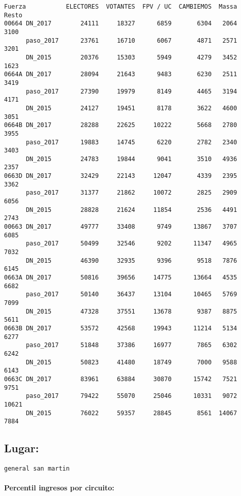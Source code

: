 \documentclass[11pt]{article}
\begin{document}
    \begin{verbatim}
Fuerza           ELECTORES  VOTANTES  FPV / UC  CAMBIEMOS  Massa  Resto
00664 DN_2017        24111     18327      6859       6304   2064   3100
      paso_2017      23761     16710      6067       4871   2571   3201
      DN_2015        20376     15303      5949       4279   3452   1623
0664A DN_2017        28094     21643      9483       6230   2511   3419
      paso_2017      27390     19979      8149       4465   3194   4171
      DN_2015        24127     19451      8178       3622   4600   3051
0664B DN_2017        28288     22625     10222       5668   2780   3955
      paso_2017      19883     14745      6220       2782   2340   3403
      DN_2015        24783     19844      9041       3510   4936   2357
0663D DN_2017        32429     22143     12047       4339   2395   3362
      paso_2017      31377     21862     10072       2825   2909   6056
      DN_2015        28828     21624     11854       2536   4491   2743
00663 DN_2017        49777     33408      9749      13867   3707   6085
      paso_2017      50499     32546      9202      11347   4965   7032
      DN_2015        46390     32935      9396       9518   7876   6145
0663A DN_2017        50816     39656     14775      13664   4535   6682
      paso_2017      50140     36437     13104      10465   5769   7099
      DN_2015        47328     37551     13678       9387   8875   5611
0663B DN_2017        53572     42568     19943      11214   5134   6277
      paso_2017      51848     37386     16977       7865   6302   6242
      DN_2015        50823     41480     18749       7000   9588   6143
0663C DN_2017        83961     63884     30870      15742   7521   9751
      paso_2017      79422     55070     25046      10331   9072  10621
      DN_2015        76022     59357     28845       8561  14067   7884
    \end{verbatim}

    
    \hypertarget{lugar}{%
\subsection{Lugar:}\label{lugar}}

    
    \begin{Verbatim}[commandchars=\\\{\}]
general san martin

    \end{Verbatim}

    \hypertarget{percentil-ingresos-por-circuito}{%
\paragraph{Percentil ingresos por
circuito:}\label{percentil-ingresos-por-circuito}}
\end{document}
